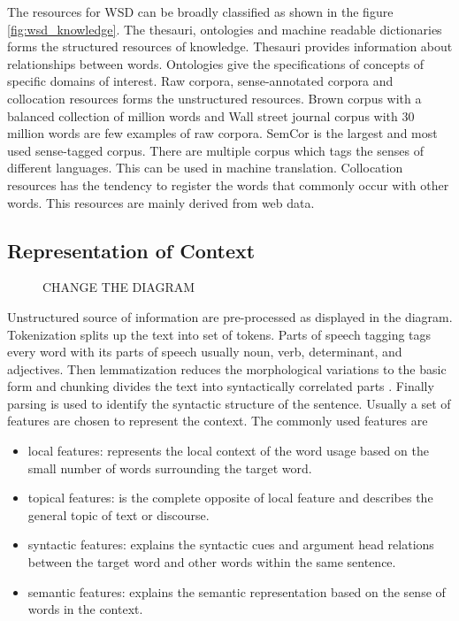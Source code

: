 \documentclass{bmcart}
\def\texttt{[image: ]}
\begin{document}
The resources for WSD can be broadly classified as shown in the figure \ref{fig:wsd_knowledge}. The thesauri, ontologies and machine readable dictionaries forms the structured resources of knowledge. Thesauri provides information about relationships between words. Ontologies give the specifications of concepts of specific domains of interest. Raw corpora, sense-annotated corpora and collocation resources forms the unstructured resources. Brown corpus with a balanced collection of million words and Wall street journal corpus with 30 million words are few examples of raw corpora. SemCor is the largest and most used sense-tagged corpus. There are multiple corpus which tags the senses of different languages. This can be used in machine translation. Collocation resources has the tendency to register the words that commonly occur with other words. This resources are mainly derived from web data. 

\subsection{Representation of Context}
\label{ssec:contextRepresentation}

\begin{figure}
\centering
{}
\caption{CHANGE THE DIAGRAM}
\end{figure}

Unstructured source of information are pre-processed as displayed in the diagram. Tokenization splits up the text into set of tokens. Parts of speech tagging tags every word with its parts of speech usually noun, verb, determinant, 	and adjectives. Then lemmatization reduces the morphological variations to the basic form and chunking divides the text into syntactically correlated parts \cite{Jurafsky}. Finally parsing is used to identify the syntactic structure of the sentence. Usually a set of features are chosen to represent the context. The commonly used features are
\begin{itemize}
\item local features: represents the local context of the word usage based on the small number of words surrounding the target word.
\item topical features: is the complete opposite of local feature and describes the general topic of text or discourse.
\item syntactic features: explains the syntactic cues and argument head relations between the target word and other words within the same sentence. 
\item semantic features: explains the semantic representation based on the sense of words in the context. 
\end{itemize}
\end{document}
